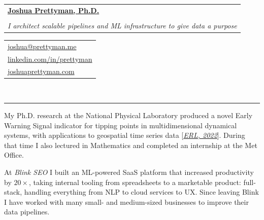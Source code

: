 \documentclass[10pt]{article}
\makeatletter
\newcommand{\makeheading}[8][]{
	\hspace*{-\marginparsep minus \marginparwidth}%
	\begin{minipage}[t]{\textwidth+\marginparwidth+\marginparsep}%
		\begin{tabular}[t]{@{}l}
		{\hspace{-8pt} \Large \bfseries#2}\\
		\\
		{\normalsize \emph{#3}}
		\end{tabular}
		\hfill
		\begin{tabular}[t]{|l}
		#4  \\
		#5  \\
		#6 \\
		
		\end{tabular}
		\vspace{1pt}
		\\[-0.2\baselineskip]%
		
		\rule{\columnwidth}{1pt}%
	\end{minipage}
}
\renewcommand{\section}[1]{
	\pagebreak[3]%
	\hyphenpenalty=10000%
	\vspace{\baselineskip}%
	\phantomsection\addcontentsline{toc}{section}{#1}%
	\noindent{\scshape #1}%
	\vspace{\baselineskip}\par
}
\newenvironment{innerlist}[1][\enskip\textbullet]{
	\begin{itemize}[#1,leftmargin=*,rightmargin=30pt,parsep=0pt,itemsep=1pt,topsep=2pt,partopsep=0pt]
}{\end{itemize}}
\providecommand*\url[1]{\href{#1}{#1}}
\renewcommand*\url[1]{\href{#1}{\texttt{#1}}}
\providecommand*\email[1]{\href{mailto:#1}{#1}}
\makeatother
\begin{document}
\makeheading{
		\href{https://joshuaprettyman.com/}{Joshua Prettyman, Ph.D.}
}
{I architect scalable pipelines and ML infrastructure to give data a purpose}
{\email{joshua@prettyman.me}}
{\href{https://www.linkedin.com/in/prettyman/}{linkedin.com/in/prettyman}}
{\href{https://joshuaprettyman.com/}{joshuaprettyman.com}}







\section{Personal Statement}
My Ph.D. research at the National Physical Laboratory produced a novel Early Warning Signal indicator
for tipping points in multidimensional dynamical systems, with applications to geospatial time series data 
[\href{https://doi.org/10.1088/1748-9326/ac526f}{\emph{ERL, 2022}}]. 
During that time I also lectured in Mathematics and completed an internship at the Met Office. \\

\vspace{-5pt}

At \emph{Blink SEO} I built an ML-powered SaaS platform that increased productivity by $20\times$, 
taking internal tooling from spreadsheets to a marketable product: full-stack, handling everything from NLP to 
cloud services to UX. Since leaving Blink I have worked with many small- and medium-sized businesses
to improve their data pipelines.
\end{document}
